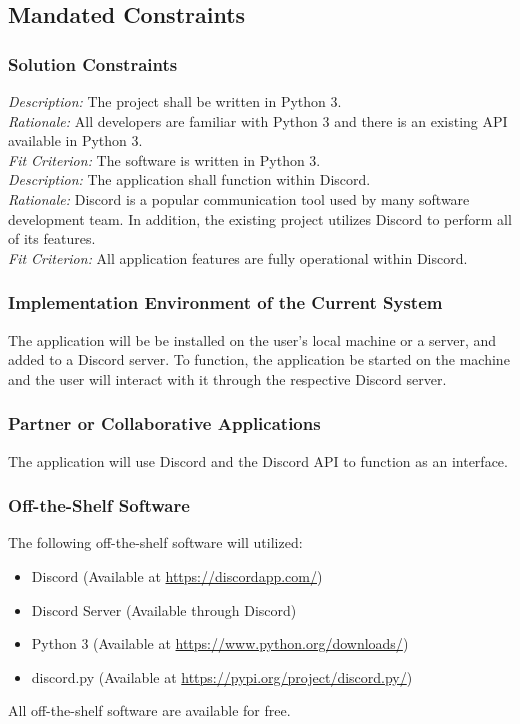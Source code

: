 \documentclass[12pt, titlepage]{article}
\begin{document}
\subsection{Mandated Constraints}
\subsubsection{Solution Constraints}
\noindent \textit{Description:} The project shall be written in Python 3.\\
\textit{Rationale:} All developers are familiar with Python 3 and there is an existing API available in Python 3.\\
\textit{Fit Criterion:} The software is written in Python 3.\\

\noindent \textit{Description:} The application shall function within Discord.\\
\textit{Rationale:} Discord is a popular communication tool used by many software development team. In addition, the existing project utilizes Discord to perform all of its features.\\
\textit{Fit Criterion:} All application features are fully operational within Discord.

\subsubsection{Implementation Environment of the Current System}
The application will be be installed on the user's local machine or a server, and added to a Discord server. To function, the application be started on the machine and the user will interact with it through the respective Discord server.

\subsubsection{Partner or Collaborative Applications}
The application will use Discord and the Discord API to function as an interface.

\subsubsection{Off-the-Shelf Software}
The following off-the-shelf software will utilized:
\begin{itemize}
    \item Discord (Available at \url{https://discordapp.com/})
    \item Discord Server (Available through Discord)
    \item Python 3 (Available at \url{https://www.python.org/downloads/})
    \item discord.py (Available at \url{https://pypi.org/project/discord.py/})
\end{itemize}
All off-the-shelf software are available for free.
\end{document}
